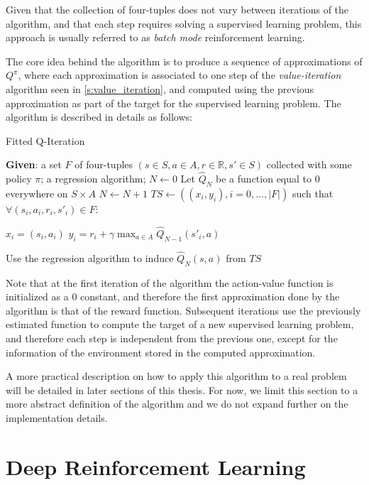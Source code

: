 Given that the collection of four-tuples does not vary between iterations of the
algorithm, and that each step requires solving a supervised learning problem, this
approach is usually referred to as \textit{batch mode} reinforcement learning.

The core idea behind the algorithm is to produce a sequence of approximations of
$Q^\pi$, where each approximation is associated to one step of the \textit{value-iteration}
algorithm seen in \ref{s:value_iteration}, and computed using the previous 
approximation as part of the target for the supervised learning problem. The 
algorithm is described in details as follows:
%
\begin{algorithm}[H]
    \caption{Fitted Q-Iteration}
    \begin{algorithmic}
        \STATE \textbf{Given}: a set $F$ of four-tuples $(s \in S, a \in A, r \in \mathbb{R}, s' \in S)$ collected with some policy $\pi$; a regression algorithm;
        \STATE $N \leftarrow 0$
        \STATE Let $\hat{Q}_N$ be a function equal to $0$ everywhere on $S \times A$
        \REPEAT
	    \STATE $N \leftarrow N+1$
	    \STATE $TS \leftarrow ((x_i, y_i), i = 0, \dots, |F|)$ such that $\forall (s_i, a_i, r_i, s'_i) \in F$:
		\begin{ALC@g}
		\STATE $x_i = (s_i, a_i)$
		\STATE $y_i = r_i + \gamma \max_{a \in A} \hat{Q}_{N-1} (s'_i, a)$
		\end{ALC@g}
	    \STATE Use the regression algorithm to induce $\hat{Q}_N(s, a)$ from $TS$
    \end{algorithmic}
\end{algorithm}
%

Note that at the first iteration of the algorithm the action-value function is
initialized as a $0$ constant, and therefore the first approximation done by the 
algorithm is that of the reward function.
Subsequent iterations use the previously estimated function to compute the target
of a new supervised learning problem, and therefore each step is independent from
the previous one, except for the information of the environment stored in the 
computed approximation. 

A more practical description on how to apply this algorithm to a real problem
will be detailed in later sections of this thesis. For now, we limit this section 
to a more abstract definition of the algorithm and we do not expand further
on the implementation details. 

\section{Deep Reinforcement Learning} \label{s:DRL}




